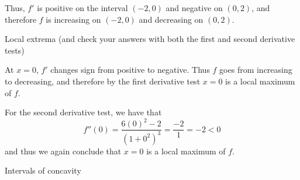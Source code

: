 \documentclass[nooutcomes]{ximera}
\renewenvironment{freeResponse}{
\ifhandout\setbox0\vbox\bgroup\else
\begin{trivlist}\item[\hskip \labelsep\bfseries Solution:\hspace{2ex}]
\fi}
{\ifhandout\egroup\else
\end{trivlist}
\fi}
\begin{document}
\begin{problem}
\begin{enumerate}
\begin{freeResponse}
		
\begin{center}
\begin{image}
\end{image}
\end{center}


		Thus, $f'$ is positive on the interval $(-2,0)$ and negative on $(0,2)$, and therefore $f$ is increasing on $(-2,0)$ and decreasing on $(0,2)$.  
		\end{freeResponse}
		
	\item  Local extrema (and check your answers with both the first and second derivative tests)
	
		\begin{freeResponse}
		At $x=0$, $f'$ changes sign from positive to negative.  Thus $f$ goes from increasing to decreasing, and therefore by the first derivative test $x=0$ is a local maximum of $f$.  
		
		For the second derivative test, we have that
		$$ f''(0) = \frac{6(0)^2 - 2}{(1+0^2)^3} = \frac{-2}{1} = -2 < 0 $$
		and thus we again conclude that $x=0$ is a local maximum of $f$.
		\end{freeResponse}
		
	\item  Intervals of concavity
	

\end{enumerate}
\end{problem}
\end{document}

